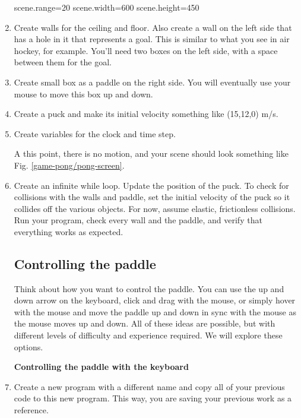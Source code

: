 \begin{enumerate}
\begin{myvpython}
scene.range=20
scene.width=600
scene.height=450
\end{myvpython}

\item Create walls for the ceiling and floor. Also create a wall on the left side that has a hole in it that represents a goal. This is similar to what you see in air hockey, for example. You'll need two boxes on the left side, with a space between them for the goal.

\item Create small box as a paddle on the right side. You will eventually use your mouse to move this box up and down.

\item Create a puck and make its initial velocity something like (15,12,0) m/s.

\item Create variables for the clock and time step.

A this point, there is no motion, and your scene should look something like Fig. \ref{game-pong/pong-screen}.



\item Create an infinite while loop. Update the position of the puck. To check for collisions with the walls and paddle, set the initial velocity of the puck so it collides off the various objects. For now, assume elastic, frictionless collisions. Run your program, check every wall and the paddle, and verify that everything works as expected.

\subsection*{Controlling the paddle}

Think about how you want to control the paddle. You can use the up and down arrow on the keyboard, click and drag with the mouse, or simply hover with the mouse and move the paddle up and down in sync with the mouse as the mouse moves up and down. All of these ideas are possible, but with different levels of difficulty and experience required. We will explore these options.

{\bf Controlling the paddle with the keyboard}

\item Create a new program with a different name and copy all of your previous code to this new program. This way, you are saving your previous work as a reference.


\end{enumerate}
